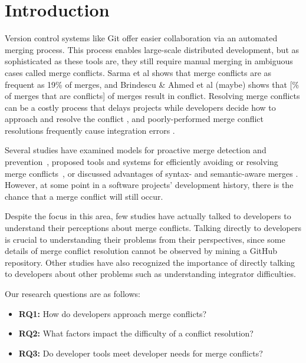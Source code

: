 \section{Introduction}\label{introduction}


Version control systems like Git offer easier collaboration via an automated merging process. This process enables large-scale distributed development, but as sophisticated as these tools are, they still require manual merging in ambiguous cases called merge conflicts. Sarma et al \cite{cassandra} shows that merge conflicts are as frequent as 19\% of merges, and Brindescu \& Ahmed et al (maybe) shows that [\% of merges that are conflicts] of merges result in conflict. Resolving merge conflicts can be a costly process that delays projects while developers decide how to approach and resolve the conflict \cite{cassandra}, and poorly-performed merge conflict resolutions frequently cause integration errors \cite{bird-branches-conflict}.


Several studies have examined models for proactive merge detection and prevention~\cite{Brun2011}\cite{palantir}\cite{Guimaraes}, proposed tools and systems for efficiently avoiding or resolving merge conflicts~\cite{nishimura}\cite{mens2002state}, or discussed advantages of syntax- and semantic-aware merges \cite{danny_refactorings}\cite{hunt2002extensible}. However, at some point in a software projects' development history, there is the chance that a merge conflict will still occur. 


Despite the focus in this area, few studies have actually talked to developers to understand their perceptions about merge conflicts. Talking directly to developers is crucial to understanding their problems from their perspectives, since some details of merge conflict resolution cannot be observed by mining a GitHub repository. Other studies have also recognized the importance of directly talking to developers about other problems such as understanding integrator difficulties.

Our research questions are as follows:
\begin{itemize}
\item\textbf{RQ1:} How do developers approach merge conflicts?\\
\item\textbf{RQ2:} What factors impact the difficulty of a conflict resolution?\\
\item\textbf{RQ3:} Do developer tools meet developer needs for merge conflicts?\\
\end{itemize}

